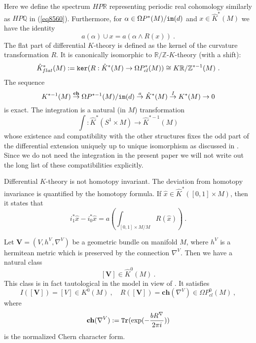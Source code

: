 \documentclass[12pt]{article}
\newcommand{\im}{{\tt im}}
\renewcommand{\ker}{{\tt ker}}
\newcommand{\Z}{{\mathbb{Z}}}
\newcommand{\Q}{{\mathbb{Q}}}
\newcommand{\R}{{\mathbb{R}}}
\newcommand{\ch}{{\mathbf{ch}}}
\newcommand{\bV}{{\mathbf{V}}}
\newcommand{\Tr}{{\tt Tr}}
\begin{document}
Here we define the spectrum $HP\R$ representing periodic real cohomology similarly as $HP\Q$ in (\ref{eq8560}).
Furthermore, for $\alpha\in \Omega P^{*}(M)/\im(d)$ and $x\in \hat K^{*}(M)$ we have the identity
\begin{equation}\label{compaprod}a(\alpha)\cup x=a(\alpha\wedge R(x))\ .\end{equation}
The flat part of differential $K$-theory  is defined as the kernel of the curvature transformation $R$. It is canonically isomorphic to $\R/\Z$-$K$-theory (with a shift):\begin{equation}\label{eq700hhh}\hat K^{*}_{flat}(M):=\ker(R:\hat K^{*}(M)\to \Omega P^{*}_{cl}(M))\cong K\R/\Z^{*-1}(M ) \ .\end{equation}
The sequence
\begin{equation}\label{eq700}K^{*-1}(M )\stackrel{\ch}{\to} \Omega P^{*-1}(M)/\im(d)\stackrel{a}{\to} \hat K^{*}(M)\stackrel{I}{\to} K^{*}(M )\to 0\end{equation}
is exact. The integration is a natural (in $M$) transformation
$$\int:\hat K^{*}(S^{1}\times M)\to \hat K^{*-1}(M)$$
whose existence and compatibility with the other structures fixes the odd part of the  differential extension uniquely up to unique isomorphism as discussed in \cite{MR2608479}.
Since we do not need the integration in the present paper we will not write out the long list of these compatibilities explicitly.


Differential $K$-theory is not homotopy invariant. The deviation from homotopy invariance is quantified by the homotopy formula. If $\hat x\in \hat K^{*}([0,1]\times M)$, then it states that
\begin{equation}\label{homotopyformula}i_{1}^{*}\hat x-i_{0}^{*}\hat x=a(\int_{[0,1]\times M/M} R(\hat x))\ . \end{equation}


Let $\bV=(V,h^{V},\nabla^{V})$ be a geometric bundle on  manifold $M$, where $h^{V}$ is a hermitean metric which is  preserved by the connection $\nabla^{V}$. Then we have a natural class
\begin{equation}\label{eq129}[\bV]\in \hat K^{0}(M)\ .\end{equation}
This class is in fact tautological in the model \cite{MR2664467} in view of \cite[2.1.4]{MR2664467}. 
It satisfies
\begin{equation}\label{ccase}I([\bV])=[V]\in K^{0}(M)\ ,\quad R([\bV])=\ch(\nabla^{V})\in \Omega P_{cl}^{0}(M)\ ,\end{equation}
where $$\ch(\nabla^{V}):=\Tr(\exp(-\frac{bR^{\nabla}}{2\pi i  }))$$ is the normalized Chern character form.
\end{document}
